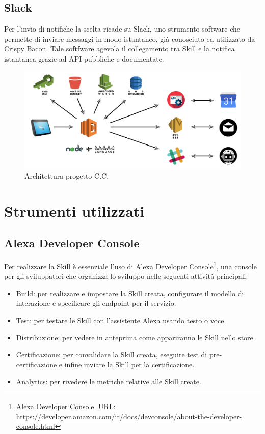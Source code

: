 \subsection{Slack}
Per l'invio di notifiche la scelta ricade su Slack, uno strumento software che permette di inviare messaggi in modo istantaneo, già conosciuto ed utilizzato da Crispy Bacon. Tale softfware agevola il collegamento tra Skill e la notifica istantanea grazie ad API pubbliche e documentate.  

\begin{figure}[H] 
    \centering 
    \includegraphics[width=1\columnwidth]{immagini/architettura.png}
    \caption{\label{fig:architettura}Architettura progetto C.C.}
\end{figure}

\section{Strumenti utilizzati}
\subsection{Alexa Developer Console}
Per realizzare la Skill è essenziale l'uso di Alexa Developer Console\footnote{Alexa Developer Console. URL: \href{https://developer.amazon.com/it/docs/devconsole/about-the-developer-console.html}{https://developer.amazon.com/it/docs/devconsole/about-the-developer-console.html}}, una console per gli sviluppatori che organizza lo sviluppo nelle seguenti attività principali:
\begin{itemize}
    \item Build: per realizzare e impostare la Skill creata, configurare il modello di interazione e specificare gli endpoint per il servizio.
    \item Test: per testare le Skill con l'assistente Alexa usando testo o voce.
    \item Distribuzione: per vedere in anteprima come appariranno le Skill nello store.
    \item Certificazione: per convalidare la Skill creata, eseguire test di pre-certificazione e infine inviare la Skill per la certificazione.
    \item Analytics: per rivedere le metriche relative alle Skill create.
\end{itemize}

